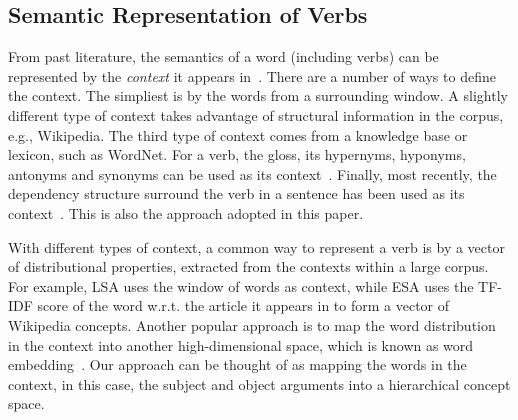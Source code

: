 \subsection{Semantic Representation of Verbs}
From past literature, the semantics of a word (including verbs) can be
represented by the {\em context} it appears in~\cite{mikolov2013efficient,mikolov2013distributed,mikolov2013linguistic,Levy-acl14}.
There are a number of ways to define the context. The simpliest is by the
words from a surrounding window.
A slightly different type of context takes advantage of structural information
in the corpus, e.g., Wikipedia. The third type of context comes from
a knowledge base or lexicon,
such as WordNet. For a verb, the gloss, its hypernyms, hyponyms, antonyms and
synonyms can be used as its context~\cite{C12-1108,Yang06verbsimilarity}.
Finally, most recently, the dependency structure surround the verb in a
sentence has been used as its context~\cite{Levy-acl14}.
This is also the approach adopted in this paper.

With different types of context, a common way to represent a verb is by
a vector of distributional properties, extracted from the contexts within
a large corpus. For example, LSA \cite{DeerwesterDLFH90}
uses the window of words as context,
while ESA \cite{GabrilovichM07:ESA} uses the TF-IDF score of the word w.r.t.
the article it appears in to form a vector of Wikipedia concepts.
Another popular approach is to map the word distribution in the context
into another high-dimensional space, which is known as word embedding~\cite{mikolov2013distributed}.
Our approach can be thought of as mapping the words in the context, in this
case, the subject and object arguments into a hierarchical concept space.


